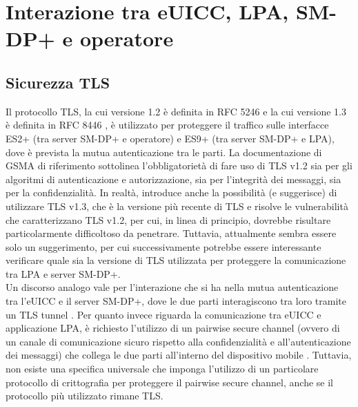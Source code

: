 \documentclass[10pt, oneside]{book}
\begin{document}
\section{Interazione tra eUICC, LPA, SM-DP+ e operatore}
\subsection{Sicurezza TLS}
Il protocollo TLS, la cui versione 1.2 è definita in RFC 5246 \cite{RFC-5246} e la cui versione 1.3 è definita in RFC 8446 \cite{RFC-8446}, è utilizzato per proteggere il traffico sulle interfacce ES2+ (tra server SM-DP+ e operatore) e ES9+ (tra server SM-DP+ e LPA), dove è prevista la mutua autenticazione tra le parti. La documentazione di GSMA di riferimento \cite{GSMA-docs-new} sottolinea l'obbligatorietà di fare uso di TLS v1.2 sia per gli algoritmi di autenticazione e autorizzazione, sia per l'integrità dei messaggi, sia per la confidenzialità. In realtà, introduce anche la possibilità (e suggerisce) di utilizzare TLS v1.3, che è la versione più recente di TLS e risolve le vulnerabilità che caratterizzano TLS v1.2, per cui, in linea di principio, dovrebbe risultare particolarmente difficoltoso da penetrare. Tuttavia, attualmente sembra essere solo un suggerimento, per cui successivamente potrebbe essere interessante verificare quale sia la versione di TLS utilizzata per proteggere la comunicazione tra LPA e server SM-DP+.\\
Un discorso analogo vale per l'interazione che si ha nella mutua autenticazione tra l'eUICC e il server SM-DP+, dove le due parti interagiscono tra loro tramite un TLS tunnel \cite{Sec-analysis}. Per quanto invece riguarda la comunicazione tra eUICC e applicazione LPA, è richiesto l'utilizzo di un pairwise secure channel (ovvero di un canale di comunicazione sicuro rispetto alla confidenzialità e all'autenticazione dei messaggi) che collega le due parti all'interno del dispositivo mobile \cite{Sec-analysis}. Tuttavia, non esiste una specifica universale che imponga l'utilizzo di un particolare protocollo di crittografia per proteggere il pairwise secure channel, anche se il protocollo più utilizzato rimane TLS.
\end{document}
